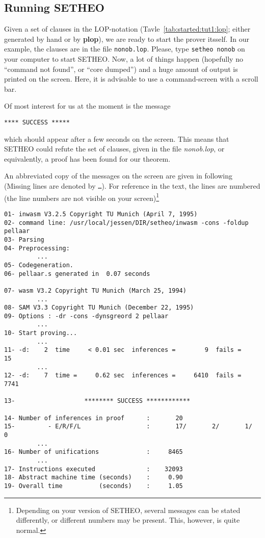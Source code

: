 \subsection{Running SETHEO}

Given a set of clauses in the LOP-notation (Tavle~\ref{tab:started:tut1:lop}; either generated by hand
or by {\bf plop}), we are ready to start the prover itsself.
In our example, the clauses are in the file {\tt nonob.lop}.
Please, type {\tt setheo nonob} on your computer to start SETHEO.
Now, a lot of things happen (hopefully no ``command not found'', or
``core dumped'') and a huge amount of output is printed on the
screen. Here, it is advisable to use a command-screen with a scroll bar.

Of most interest for us at the moment is the message
\begin{center}
{\tt ***** SUCCESS *****}
\end{center}
 which should appear after a few seconds 
on the screen.
This means that SETHEO could refute the set of clauses, given in the
file {\em nonob.lop}, or equivalently, a proof has been found for
our theorem.

An abbreviated copy of the messages on the screen are given in following
(Missing lines are denoted by  {\tt \ldots}). For reference in the
text, the lines are numbered (the line numbers are not visible on
your screen)\footnote{
	Depending on your version of SETHEO, several messages
	can be stated differently, or different numbers may be
	present. This, however, is quite normal.
	}

\begin{verbatim}
01- inwasm V3.2.5 Copyright TU Munich (April 7, 1995) 
02- command line: /usr/local/jessen/DIR/setheo/inwasm -cons -foldup pellaar 
03- Parsing 
04- Preprocessing: 
         ...
05- Codegeneration.
06- pellaar.s generated in  0.07 seconds

07- wasm V3.2 Copyright TU Munich (March 25, 1994)
         ...
08- SAM V3.3 Copyright TU Munich (December 22, 1995)
09- Options : -dr -cons -dynsgreord 2 pellaar 
         ...
10- Start proving...
         ...
11- -d:    2  time     < 0.01 sec  inferences =        9  fails =       15
         ...
12- -d:    7  time =     0.62 sec  inferences =     6410  fails =     7741

13-                   ******** SUCCESS ************

14- Number of inferences in proof      :       20
15-         - E/R/F/L                  :       17/       2/       1/       0
         ...
16- Number of unifications             :     8465
         ...
17- Instructions executed              :    32093
18- Abstract machine time (seconds)    :     0.90
19- Overall time          (seconds)    :     1.05
\end{verbatim}



